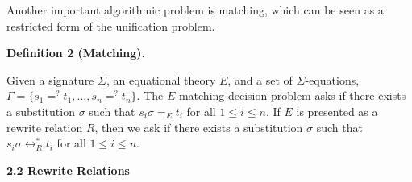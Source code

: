  
 
 
Another important algorithmic problem is matching, which can be seen as a restricted form of the unification problem.\par
 
 
 
\par\medskip\noindent\textbf{Definition 2 (Matching).}\par
 
 
Given a signature $\Sigma$, an equational theory $E$, and a set of $\Sigma$-equations, $\Gamma=\{s_{1}=^{?}t_{1},\dots,s_{n}=^{?}t_{n}\}$. The $E$-matching decision problem asks if there exists a substitution $\sigma$ such that $s_{i}\sigma=_{E}t_{i}$ for all $1\leq i\leq n$. If $E$ is presented as a rewrite relation $R$, then we ask if there exists a substitution $\sigma$ such that $s_{i}\sigma\leftrightarrow_{R}^{*}t_{i}$ for all $1\leq i\leq n$.\par
 
 
 
 
 
\par\medskip\noindent\textbf{2.2 Rewrite Relations}\par
 
 
